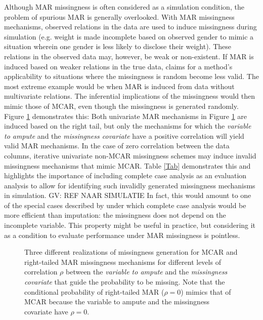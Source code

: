 \documentclass[bimj,fleqn]{w-art}
\begin{document}
Although MAR missingness is often considered as a simulation condition, the problem of spurious MAR is generally overlooked. With MAR missingness mechanisms, observed relations in the data are used to induce missingness during simulation (e.g. weight is made incomplete based on observed gender to mimic a situation wherein one gender is less likely to disclose their weight). These relations in the observed data may, however, be weak or non-existent. If MAR is induced based on weaker relations in the true data, claims for a method's applicability to situations where the missingness is random become less valid. The most extreme example would be when MAR is induced from data without multivariate relations. The inferential implications of the missingness would then mimic those of MCAR, even though the missingness is generated randomly. Figure \ref{Fig} demonstrates this: Both univariate MAR mechanisms in Figure \ref{Fig} are induced based on the right tail, but only the mechanisms for which the \emph{variable to ampute} and the \emph{missingness covariate} have a positive correlation will yield valid MAR mechanisms. In the case of zero correlation between the data columns, iterative univariate non-MCAR missingness schemes may induce invalid missingness mechanisms that mimic MCAR. Table \ref{Tab} demonstrates this and highlights the importance of including complete case analysis as an evaluation analysis to allow for identifying such invalidly generated missingness mechanisms in simulation. GV: REF NAAR SIMULATIE In fact, this would amount to one of the special cases described by \citet{buur18} under which complete case analysis would be more efficient than imputation: the missingness does not depend on the incomplete variable. This property might be useful in practice, but considering it as a condition to evaluate performance under MAR missingness is pointless. 

\begin{figure}[t!]
  \caption{Three different realizations of missingness generation for MCAR and right-tailed MAR missingness mechanisms for different levels of correlation $\rho$ between the \emph{variable to ampute} and the \emph{missingness covariate} that guide the probability to be missing. Note that the conditional probability of right-tailed MAR ($\rho=0$) mimics that of MCAR because the variable to ampute and the missingness covariate have $\rho=0$.}
    \label{Fig}
\end{figure}
\end{document}
